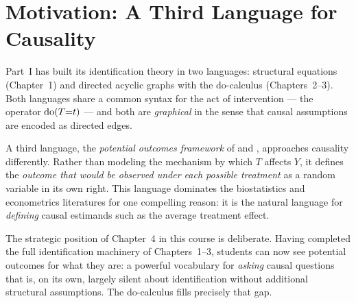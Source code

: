 \documentclass[master.tex]{subfiles}
\begin{document}
\section{Motivation: A Third Language for Causality}
\label{w4:sec:motivation}

Part~I has built its identification theory in two languages: structural
equations (Chapter~1) and directed acyclic graphs with the do-calculus
(Chapters~2--3).  Both languages share a common syntax for the act of
intervention --- the operator $\mathrm{do}(T{=}t)$ --- and both are
\emph{graphical} in the sense that causal assumptions are encoded as
directed edges.

A third language, the \emph{potential outcomes framework} of
\citet{neyman1923application} and \citet{rubin1974estimating}, approaches
causality differently.  Rather than modeling the mechanism by which $T$
affects $Y$, it defines the \emph{outcome that would be observed under each
possible treatment} as a random variable in its own right.  This language
dominates the biostatistics and econometrics literatures for one compelling
reason: it is the natural language for \emph{defining} causal estimands such
as the average treatment effect.

The strategic position of Chapter~4 in this course is deliberate.  Having
completed the full identification machinery of Chapters~1--3, students can now
see potential outcomes for what they are: a powerful vocabulary for
\emph{asking} causal questions that is, on its own, largely silent about
identification without additional structural assumptions.  The do-calculus
fills precisely that gap.
\end{document}
